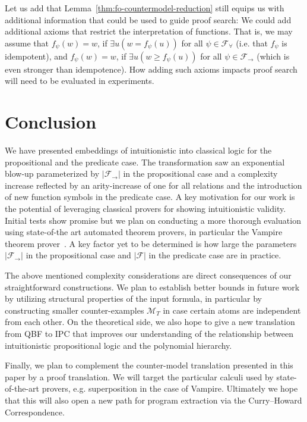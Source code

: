 \documentclass[runningheads]{llncs}
\begin{document}
Let us add that Lemma~\ref{thm:fo-countermodel-reduction} still equips us with additional information that could be used to guide proof search: We could add additional axioms that restrict the interpretation of functions. That is, we may assume that $f_\psi(w) = w$, if $\exists u(w = f_\psi(u))$ for all $\psi\in\mathcal F_\forall$ (i.e. that $f_\psi$ is idempotent), and $f_\psi(w) = w$, if $\exists u(w \geq f_\psi(u))$ for all $\psi\in\mathcal F_\to$ (which is even stronger than idempotence).
How adding such axioms impacts proof search will need to be evaluated in experiments.

\section{Conclusion}

We have presented embeddings of intuitionistic into classical logic for the propositional and the predicate case.
The transformation saw an exponential blow-up parameterized by $|\mathcal F_\to|$ in the propositional case and a complexity increase reflected by an arity-increase of one for all relations and the introduction of new function symbols in the predicate case.
A key motivation for our work is the potential of leveraging classical provers for showing intuitionistic validity.
Initial tests show promise but we plan on conducting a more thorough evaluation using state-of-the art automated theorem provers, in particular the Vampire theorem prover~\cite{kovacs2013first}.
A key factor yet to be determined is how large the parameters $|\mathcal F_\to|$ in the propositional case and $|\mathcal F|$ in the predicate case are in practice.

The above mentioned complexity considerations are direct consequences of our straightforward constructions.
We plan to establish better bounds in future work by utilizing structural properties of the input formula, in particular by constructing smaller counter-examples $\mathcal M_T$ in case certain atoms are independent from each other.
On the theoretical side, we also hope to give a new translation from QBF to IPC that improves our understanding of the relationship between intuitionistic propositional logic and the polynomial hierarchy.

Finally, we plan to complement the counter-model translation presented in this paper by a proof translation.
We will target the particular calculi used by state-of-the-art provers, e.g. superposition in the case of Vampire. Ultimately we hope that this will also open a new path for program extraction via the Curry--Howard Correspondence.
\end{document}
